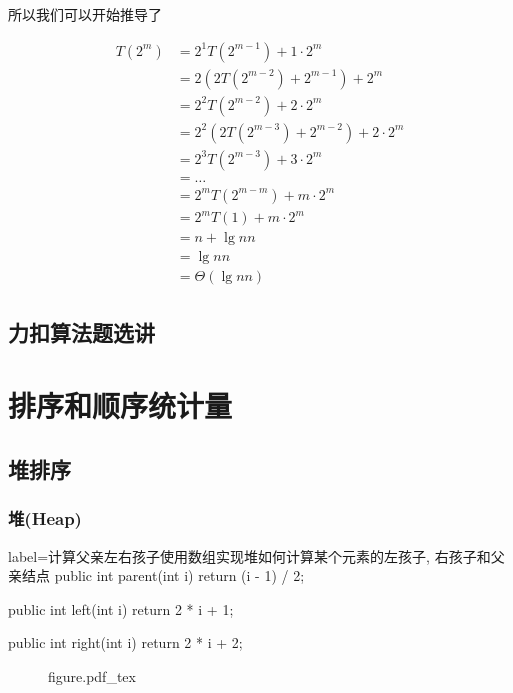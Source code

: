 \documentclass[oneside,10pt,fontset=none]{ctexbook}
\numberwithin{definition}{chapter}
\numberwithin{theorem}{chapter}
\numberwithin{lemma}{chapter}
\begin{document}
所以我们可以开始推导了

\begin{equation*}\begin{split}
T(2^m) &= 2^1T(2^{m-1}) + 1\cdot 2^m \\
       &= 2(2T(2^{m-2}) + 2^{m-1}) + 2^m \\
       &= 2^2T(2^{m-2}) + 2\cdot 2^m \\
       &= 2^2(2T(2^{m-3}) + 2^{m-2}) + 2\cdot 2^m \\
       &= 2^3T(2^{m-3}) + 3\cdot 2^m \\
       &= \dots \\
       &= 2^mT(2^{m - m}) + m\cdot 2^m \\
       &= 2^mT(1) + m\cdot 2^m \\
       &= n + \lg{n}n \\
       &= \lg{n}n \\
       &= \Theta(\lg{n}n)
\end{split}\end{equation*}

\chapter{力扣算法题选讲}



\part{排序和顺序统计量}

\chapter{堆排序}

\section{堆(Heap)}

\begin{myjava}{label={计算父亲左右孩子}}{使用数组实现堆如何计算某个元素的左孩子, 右孩子和父亲结点}{}
public int parent(int i) {
    return (i - 1) / 2;
}

public int left(int i) {
    return 2 * i + 1;
}

public int right(int i) {
    return 2 * i + 2;
}
\end{myjava}

\begin{figure}[htbp]
    \centering
    \def\svgwidth{\columnwidth}
    {figure.pdf_tex}
\end{figure}
\end{document}
